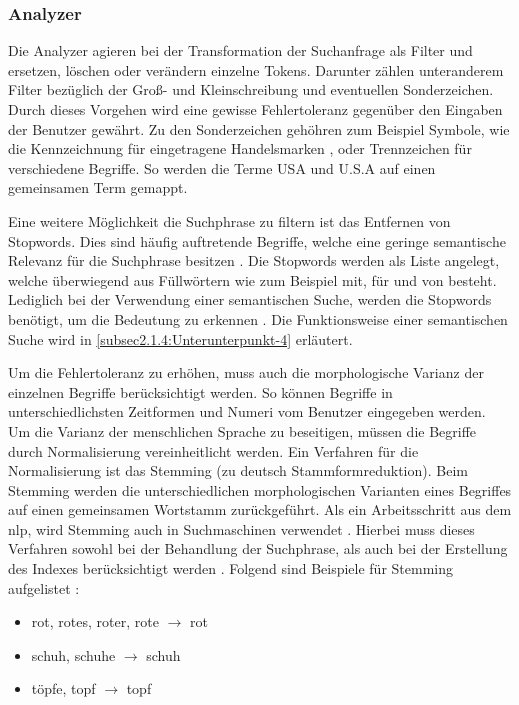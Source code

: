 \subsubsection{Analyzer}

Die Analyzer agieren bei der Transformation der Suchanfrage als Filter und ersetzen, löschen oder verändern einzelne Tokens. Darunter zählen unteranderem Filter bezüglich der Groß- und Kleinschreibung und eventuellen Sonderzeichen. Durch dieses Vorgehen wird eine gewisse Fehlertoleranz gegenüber den Eingaben der Benutzer gewährt. Zu den Sonderzeichen gehöhren zum Beispiel Symbole, wie die Kennzeichnung für eingetragene Handelsmarken \glqq \textregistered\grqq{}, oder Trennzeichen für verschiedene Begriffe. So werden die Terme \glqq USA\grqq{} und \glqq U.S.A\grqq{} auf einen gemeinsamen Term gemappt.

Eine weitere Möglichkeit die Suchphrase zu filtern ist das Entfernen von Stopwords. Dies sind häufig auftretende Begriffe, welche eine geringe semantische Relevanz für die Suchphrase besitzen \cite{SebastianRuss.2017}. Die Stopwords werden als Liste angelegt, welche überwiegend aus Füllwörtern wie zum Beispiel \glqq mit\grqq{}, \glqq für\grqq{} und \glqq von\grqq{} besteht. Lediglich bei der Verwendung einer semantischen Suche, werden die Stopwords benötigt, um die Bedeutung zu erkennen \cite{SebastianRuss.2017}. Die Funktionsweise einer semantischen Suche wird in \autoref{subsec2.1.4:Unterunterpunkt-4} erläutert.

Um die Fehlertoleranz zu erhöhen, muss auch die morphologische Varianz der einzelnen Begriffe berücksichtigt werden. So können Begriffe in unterschiedlichsten Zeitformen und Numeri vom Benutzer eingegeben werden. Um die Varianz der menschlichen Sprache zu beseitigen, müssen die Begriffe durch Normalisierung vereinheitlicht werden. Ein Verfahren für die Normalisierung ist das \glqq Stemming\grqq{} (zu deutsch Stammformreduktion). Beim Stemming werden die unterschiedlichen morphologischen Varianten eines Begriffes auf einen gemeinsamen Wortstamm zurückgeführt. Als ein Arbeitsschritt aus dem \gls{nlp}, wird Stemming auch in Suchmaschinen verwendet \cite{StefanLuber.2020}. Hierbei muss dieses Verfahren sowohl bei der Behandlung der Suchphrase, als auch bei der Erstellung des Indexes berücksichtigt werden \cite{SebastianRuss.2017}. Folgend sind Beispiele für Stemming aufgelistet \cite{SebastianRuss.2017}:

\begin{itemize}
    \item rot, rotes, roter, rote $\rightarrow$ rot
    \item schuh, schuhe $\rightarrow$ schuh
    \item töpfe, topf $\rightarrow$ topf
\end{itemize}

